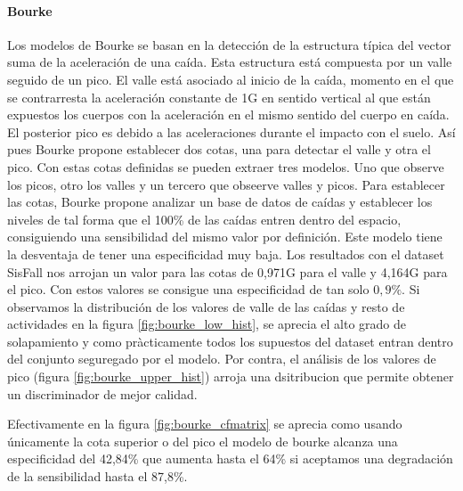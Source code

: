 \begin{comment}
  Viene del apartadoanterior a sugerencia de la profe
\end{comment}

\paragraph{Bourke} Los modelos de Bourke \cite{Bourke2006} se basan en la detección de la estructura típica del vector suma de la aceleración de una caída. Esta estructura está compuesta por un valle seguido de un pico. El valle está asociado al inicio de la caída, momento en el que se contrarresta la aceleración constante de 1G en sentido vertical al que están expuestos los cuerpos con la aceleración en el mismo sentido del cuerpo en caída. El posterior pico es debido a las aceleraciones durante el impacto con el suelo. Así pues Bourke propone establecer dos cotas, una para detectar el valle y otra el pico. Con estas cotas definidas se pueden extraer tres modelos. Uno que observe los picos, otro los valles y un tercero que obseerve valles y picos.
Para establecer las cotas, Bourke propone analizar un base de datos de caídas y establecer los niveles de tal forma que el 100\% de las caídas entren dentro del espacio, consiguiendo una sensibilidad del mismo valor por definición. Este modelo tiene la desventaja de tener una especificidad muy baja. Los resultados con el dataset SisFall nos arrojan un valor para las cotas de 0,971G para el valle y 4,164G para el pico. Con estos valores se consigue una especificidad de tan solo $0,9\%$. Si observamos la distribución de los valores de valle de las caídas y resto de actividades en la figura \ref{fig:bourke_low_hist}, se aprecia el alto grado de solapamiento y como pràcticamente todos los supuestos del dataset entran dentro del conjunto seguregado por el modelo. Por contra, el análisis de los valores de pico (figura \ref{fig:bourke_upper_hist}) arroja una dsitribucion que permite obtener un discriminador de mejor calidad.


Efectivamente en la figura \ref{fig:bourke_cfmatrix} se aprecia como usando únicamente la cota superior o del pico el modelo de bourke alcanza una especificidad del 42,84\% que aumenta hasta el 64\% si aceptamos una degradación de la sensibilidad hasta el 87,8\%.



